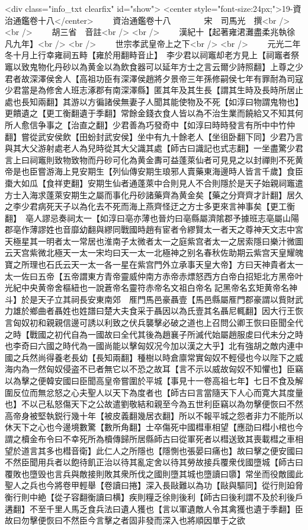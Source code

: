 <div class="info_txt clearfix" id="show">
<center style="font-size:24px;">19-資治通鑑卷十八</center>
  　　資治通鑑卷十八　　　　宋　司馬光　撰<br />
<br />
　　胡三省　音註<br />
<br />
　　漢紀十【起著雍涒灘盡柔兆執徐凡九年】<br />
<br />
　　世宗孝武皇帝上之下<br />
<br />
　　元光二年冬十月上行幸雍祠五畤【雍於用翻畤音止】　李少君以祠竈却老方見上【祠竈者祭竈以致鬼物化丹砂以為黄金以為飲食器可以延年方士之言云爾少詩照翻】上尊之少君者故深澤侯舍人【高祖功臣有深澤侯趙將夕景帝三年孫修嗣侯七年有罪耐為司寇少君當是為修舍人班志涿郡有南深澤縣】匿其年及其生長【謂其生時及長時所居止處也長知兩翻】其游以方徧諸侯無妻子人聞其能使物及不死【如淳曰物謂鬼物也】更饋遺之【更工衡翻遺于季翻】常餘金錢衣食人皆以為不治生業而饒給又不知其何所人愈信争事之【治直之翻】少君善為巧發奇中【如淳曰時時發言有所中中竹仲翻】嘗從武安侯飲【田蚡封武安侯】坐中有九十餘老人【坐徂卧翻下同】少君乃言與其大父游射處老人為兒時從其大父識其處【師古曰識記也式志翻】一坐盡驚少君言上曰祠竈則致物致物而丹砂可化為黄金夀可益蓬萊仙者可見見之以封禪則不死黄帝是也臣嘗游海上見安期生【列仙傳安期生琅邪人賣藥東海邊時人皆言千歲】食臣棗大如瓜【食祥吏翻】安期生仙者通蓬萊中合則見人不合則隱於是天子始親祠竈遣方士入海求蓬萊安期生之屬而事化丹砂諸藥齊為黄金矣【藥之分齊齊才計翻】居久之李少君病死天子以為化去不死而海上燕齊怪迂之方士多更來言神事矣【更工衡翻】　亳人謬忌奏祠太一【如淳曰亳亦薄也晉灼曰亳縣屬濟隂郡予據班志亳屬山陽郡亳作薄謬姓也音靡幼翻與繆同戰國時趙有宦者令繆賢太一者天之尊神天文志中宮天極星其一明者太一常居也淮南子太微者太一之庭紫宫者太一之居索隱曰樂汁微圖云天宫紫微北極天一太一宋均曰天一太一北極神之别名春秋佐助期云紫宫天皇耀魄寶之所理也石氏云天一太一各一星在紫宫門外立承事天皇大帝】方曰天神貴者太一太一佐曰五帝【五帝謂東方青帝靈威仲南方赤帝赤熛怒西方白帝白招矩北方黑帝叶光紀中央黄帝舍樞紐也一說蒼帝名靈符赤帝名文祖白帝名記黑帝名玄矩黄帝名神斗】於是天子立其祠長安東南郊　㕍門馬邑豪聶壹【馬邑縣屬㕍門郡豪謂以貲財武力雄於鄉曲者聶姓也姓譜曰楚大夫食采于聶因以為氏壹其名聶尼輒翻】因大行王恢言匈奴初和親親信邊可誘以利致之伏兵襲擊必破之道也上召問公卿王恢曰臣聞全代之時【戰國之初代自為一國故曰全代其後為趙襄子所滅代始屬趙服䖍曰代未分之時也李奇曰六國之時代為一國尚能以擊匈奴况今加以漢之大乎】北有強胡之敵内連中國之兵然尚得養老長幼【長知兩翻】種樹以時倉廪常實匈奴不輕侵也今以陛下之威海内為一然匈奴侵盗不已者無它以不恐之故耳【言不示以威故匈奴不知懼也】臣竊以為擊之便韓安國曰臣聞高皇帝嘗圍於平城【事見十一卷高祖七年】七日不食及解圍反位而無忿怒之心夫聖人以天下為度者也【師古曰言當隨天下人心而寛大其度量也】不以己私怒傷天下之公故遣劉敬結和親至今為五世利臣竊以為勿擊便恢曰不然高帝身被堅執鋭行幾十年【被皮義翻幾居衣翻】所以不報平城之怨者非力不能所以休天下之心也今邊境數驚【數所角翻】士卒傷死中國槥車相望【應劭曰槥小棺也今謂之櫝金布令曰不幸死所為櫝傳歸所居縣師古曰從軍死者以槥送致其喪載槥之車相望於道言其多也槥音衛】此仁人之所隱也【隱惻也張晏曰痛也】故曰擊之便安國曰不然臣聞用兵者以飽待飢正治以待其亂定舍以待其勞故接兵覆衆伐國墮城【師古曰覆敗也墮毁也言兵與敵接則敗其衆所伐之國則墮其城也墮讀曰隳】常坐而役敵國此聖人之兵也今將卷甲輕舉【卷讀曰捲】深入長敺難以為功【敺與驅同】從行則廹脅衡行則中絶【從子容翻衡讀曰横】疾則糧乏徐則後利【師古曰後利謂不及於利後戶遘翻】不至千里人馬乏食兵法曰遺人獲也【言以軍遺敵人令其禽獲也遺于季翻】臣故曰勿擊便恢曰不然臣今言擊之者固非發而深入也將順因單于之欲
